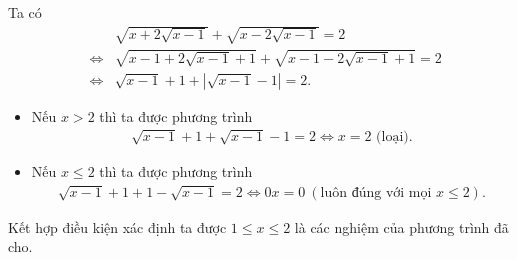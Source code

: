 \begin{bt}
{\begin{enumerate}
			Ta có
			\allowdisplaybreaks
			\begin{eqnarray*}
				&& \sqrt{x+2\sqrt{x-1}} + \sqrt{x-2\sqrt{x-1}} = 2\\
				&\Leftrightarrow & \sqrt{x-1+2\sqrt{x-1}+1}+\sqrt{x-1-2\sqrt{x-1}+1}=2\\
				&\Leftrightarrow & \sqrt{x-1}+1+\left|\sqrt{x-1}-1 \right|=2.
			\end{eqnarray*}
			\begin{itemize}
				\item Nếu $x>2$ thì ta được phương trình
				\begin{eqnarray*}
					\sqrt{x-1}+1+\sqrt{x-1}-1=2\Leftrightarrow x=2 \text{ (loại)}.
				\end{eqnarray*}
				\item Nếu $x\le 2$ thì ta được phương trình
				\begin{eqnarray*}
					\sqrt{x-1}+1+1-\sqrt{x-1}=2\Leftrightarrow 0x=0 ~(\text{luôn đúng với mọi } x\leq 2).
				\end{eqnarray*}
			\end{itemize}
			Kết hợp điều kiện xác định ta được $1\leq x \leq 2$ là các nghiệm của phương trình đã cho.
		\end{enumerate}
	}
\end{bt}

